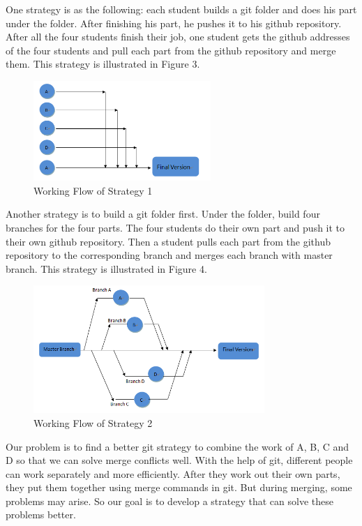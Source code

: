 \documentclass[12pt]{article}
\begin{document}
One strategy is as the following: each student builds a git folder and does his part under the folder. After finishing his part, he pushes it to his github repository. After all the four students finish their job, one student gets the github addresses of the four students and pull each part from the github repository and merge them. This strategy is illustrated in Figure 3.\\
\begin{figure}[!htb]
    \begin{center}
        \includegraphics[width=0.6\textwidth]{1.png}
    \end{center}
    \caption{Working Flow of Strategy 1}
\end{figure}

Another strategy is to build a git folder first. Under the folder, build four branches for the four parts. The four students do their own part and push it to their own github repository. Then a student pulls each part from the github repository to the corresponding branch and merges each branch with master branch. This strategy is illustrated in Figure 4.\\
\begin{figure}[!htb]
    \begin{center}
        \includegraphics[width=0.78\textwidth]{2.png}
    \end{center}
    \caption{Working Flow of Strategy 2}
\end{figure}

Our problem is to find a better git strategy to combine the work of A, B, C and D so that we can solve merge conflicts well. With the help of git, different people can work separately and more efficiently. After they work out their own parts, they put them together using merge commands in git. But during merging, some problems may arise. So our goal is to develop a strategy that can solve these problems better.\\
\end{document}
